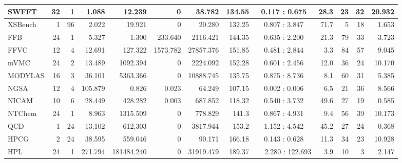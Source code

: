 \begin{table*}[tbp]
\begin{tabular}{|l|r|r|r|r|r|r|r|c|r|r|r|r|}
        SWFFT	    &	32	&	1	&	1.088	&	12.239	&	0	&	38.782	&	134.55	&	0.117 : 0.675	&	28.3	&	23		&    32	&	20.932	\\ \hline \rC
        XSBench	    &	1	&	96	&	2.022	&	19.921	&	0	&	20.280	&	132.25	&	0.807 : 3.847	&	71.7	&	5		&    18	&	1.653	\\ \hline\hline
        FFB	        &	24	&	1	&	5.327	&	1.300	&	233.640	&	2116.421	&	144.35	&	0.635 : 2.200	&	21.3	&	79		&    33	&	3.723	\\ \hline \rC
        FFVC	    &	12	&	4	&	12.691	&	127.322	&	1573.782	&	27857.376	&	151.85	&	0.481 : 2.844	&	3.3		&	84		&    57	&	9.045	\\ \hline
        mVMC	    &	24	&	2	&	13.489	&	1092.394	&	0	&	2224.092	&	152.28	&	0.601 : 2.456	&	12.0	&	36		&    24	&	10.170	\\ \hline \rC
        MODYLAS	    &	16	&	3	&	36.101	&	5363.366	&	0	&	10888.745	&	135.75	&	0.875 : 8.736	&	8.1		&	60		&    31	&	5.385	\\ \hline
        NGSA	    &	12	&	4	&	105.879	&	0.826	&	0.023	&	64.249	&	107.15	&	0.002 : 0.006	&	6.5		&	21		&    36	&	8.566	\\ \hline \rC
        NICAM	    &	10	&	6	&	28.449	&	428.282	&	0.003	&	687.852	&	118.32	&	0.540 : 3.732	&	49.6	&	27		&    19	&	0.585	\\ \hline
        NTChem	    &	24	&	1	&	8.963	&	1315.509	&	0	&	778.829	&	141.3	&	0.867 : 4.931	&	9.4		&	56		&    39	&	10.173	\\ \hline \rC
        QCD	        &	1	&	24	&	13.102	&	612.303	&	0	&	3817.944	&	153.2	&	1.152 : 4.542	&	45.2	&	27		&    24	&	0.368	\\ \hline\hline
        HPCG	    &	2	&	24	&	38.595	&	559.046	&	0	&	90.171	&	166.18	&	0.143 : 0.628	&	11.3	&	34		&    23		&	10.928	\\ \hline \rC
        HPL	        &	24	&	1	&	271.794	&	181484.240	&	0	&	31919.479	&	189.37	&	\,~~2.280 : 122.693	&	3.9		&	10		&    3    	&	2.147	\\ \hline
    \end{tabular}
\end{table*}
